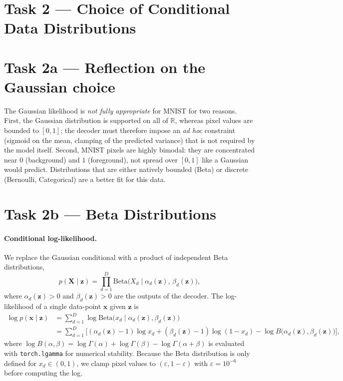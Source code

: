 \documentclass{article}
\newcommand{\bx}{\mathbf{x}}
\newcommand{\bX}{\mathbf{X}}
\newcommand{\bz}{\mathbf{z}}
\begin{document}
\section{Task 2 --- Choice of Conditional Data Distributions}

\section*{Task 2a --- Reflection on the Gaussian choice}

The Gaussian likelihood is \emph{not fully appropriate} for MNIST for two reasons.
First, the Gaussian distribution is supported on all of $\mathbb{R}$, whereas pixel
values are bounded to $[0, 1]$; the decoder must therefore impose an \emph{ad hoc}
constraint (sigmoid on the mean, clamping of the predicted variance) that is not
required by the model itself.  Second, MNIST pixels are highly bimodal: they are
concentrated near $0$ (background) and $1$ (foreground), not spread over $[0, 1]$
like a Gaussian would predict.  Distributions that are either natively bounded (Beta)
or discrete (Bernoulli, Categorical) are a better fit for this data.

\section*{Task 2b --- Beta Distributions}

\paragraph{Conditional log-likelihood.}
We replace the Gaussian conditional with a product of independent Beta distributions,
\[
p(\bX \mid \bz)
= \prod_{d=1}^{D} \mathrm{Beta}\!\big(X_d \mid \alpha_d(\bz),\, \beta_d(\bz)\big),
\]
where $\alpha_d(\bz)>0$ and $\beta_d(\bz)>0$ are the outputs of the decoder.
The log-likelihood of a single data-point $\bx$ given $\bz$ is
\begin{align}
\log p(\bx \mid \bz)
&= \sum_{d=1}^{D} \log \mathrm{Beta}\!\big(x_d \mid \alpha_d(\bz), \beta_d(\bz)\big) \nonumber \\
&= \sum_{d=1}^{D} \Big[
    (\alpha_d(\bz)-1)\log x_d
    + (\beta_d(\bz)-1)\log(1-x_d)
    - \log B\!\big(\alpha_d(\bz), \beta_d(\bz)\big)
   \Big],
\end{align}
where $\log B(\alpha,\beta) = \log\Gamma(\alpha) + \log\Gamma(\beta) - \log\Gamma(\alpha+\beta)$
is evaluated with \texttt{torch.lgamma} for numerical stability.  Because the Beta
distribution is only defined for $x_d \in (0, 1)$, we clamp pixel values to
$(\varepsilon, 1-\varepsilon)$ with $\varepsilon = 10^{-6}$ before computing
the log.
\end{document}
